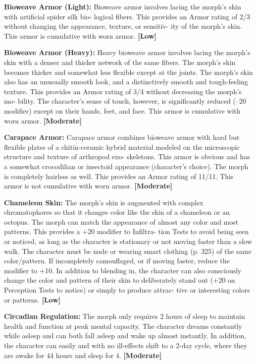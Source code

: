 \textbf{Bioweave Armor (Light):} Bioweave armor involves 
lacing the morph's skin with artificial spider silk bio-
logical fibers. This provides an Armor rating of 2/3 
without changing the appearance, texture, or sensitiv-
ity of the morph's skin. This armor is cumulative with 
worn armor. \textbf{[Low]}

\textbf{Bioweave Armor (Heavy):} Heavy bioweave armor 
involves lacing the morph's skin with a denser and 
thicker network of the same fibers. The  morph's 
skin becomes thicker and somewhat less flexible 
except at the joints. The morph's skin also has an 
unusually smooth look, and a distinctively smooth 
and tough-feeling texture. This provides an Armor 
rating of 3/4 without decreasing the morph's mo-
bility. The character's sense of touch, however, is 
significantly reduced (–20 modifier) except on their 
hands, feet, and face. This armor is cumulative with 
worn armor. \textbf{[Moderate]}

\textbf{Carapace Armor:} Carapace armor combines 
bioweave armor with hard but flexible plates of 
a chitin-ceramic hybrid material modeled on the 
microscopic structure and texture of arthropod exo-
skeletons. This armor is obvious and has a somewhat 
crocodilian or insectoid appearance (character's 
choice). The morph is completely hairless as well. This 
provides an Armor rating of 11/11. This armor is not 
cumulative with worn armor. \textbf{[Moderate]}

\textbf{Chameleon Skin: }The morph's skin is augmented 
with complex chromatophores so that it changes color 
like the skin of a chameleon or an octopus. The morph 
can match the appearance of almost any color and 
most patterns. This provides a +20 modifier to Infiltra-
tion Tests to avoid being seen or noticed, as long as 
the character is stationary or not moving faster than 
a slow walk. The character must be nude or wearing 
smart clothing (p. 325) of the same color/pattern. If 
incompletely camouflaged, or if moving faster, reduce 
the modifier to +10. In addition to blending in, the 
character can also consciously change the color and 
pattern of their skin to deliberately stand out (+20 on 
Perception Tests to notice) or simply to produce attrac-
tive or interesting colors or patterns. \textbf{[Low]}

\textbf{Circadian Regulation:} The morph only requires 
2 hours of sleep to maintain health and function at 
peak mental capacity. The character dreams constantly 
while asleep and can both fall asleep and wake up 
almost instantly. In addition, the character can easily 
and with no ill-effects shift to a 2-day cycle, where they 
are awake for 44 hours and sleep for 4. \textbf{[Moderate]}

